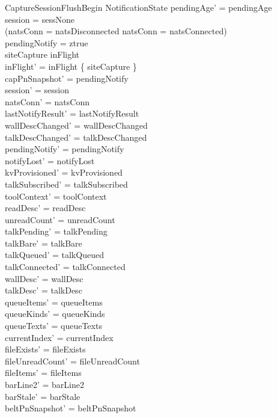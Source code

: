 \documentclass[a4paper,10pt,fleqn]{article}
\begin{document}
\begin{schema}{CaptureSessionFlushBegin}
  \Delta NotificationState
  \where
  pendingAge' = pendingAge \\
  session = sessNone \\
  (natsConn = natsDisconnected \lor natsConn = natsConnected) \\
  pendingNotify = ztrue \\
  siteCapture \notin inFlight \\
  inFlight' = inFlight \cup \{ siteCapture \} \\
  capPnSnapshot' = pendingNotify \\
  session' = session \\
  natsConn' = natsConn \\
  lastNotifyResult' = lastNotifyResult \\
  wallDescChanged' = wallDescChanged \\
  talkDescChanged' = talkDescChanged \\
  pendingNotify' = pendingNotify \\
  notifyLost' = notifyLost \\
  kvProvisioned' = kvProvisioned \\
  talkSubscribed' = talkSubscribed \\
  toolContext' = toolContext \\
  readDesc' = readDesc \\
  unreadCount' = unreadCount \\
  talkPending' = talkPending \\
  talkBare' = talkBare \\
  talkQueued' = talkQueued \\
  talkConnected' = talkConnected \\
  wallDesc' = wallDesc \\
  talkDesc' = talkDesc \\
  queueItems' = queueItems \\
  queueKinds' = queueKinds \\
  queueTexts' = queueTexts \\
  currentIndex' = currentIndex \\
  fileExists' = fileExists \\
  fileUnreadCount' = fileUnreadCount \\
  fileItems' = fileItems \\
  barLine2' = barLine2 \\
  barStale' = barStale \\
  beltPnSnapshot' = beltPnSnapshot \\

\end{schema}
\end{document}
